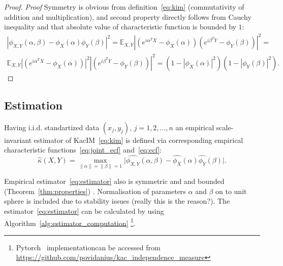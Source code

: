 \documentclass{article}
\begin{document}
\begin{proof}
\textit{Proof}
Symmetry is obvious from definition~\eqref{eq:kim} (commutativity of addition and multiplication), and second property directly follows from Cauchy inequality and that absolute value of characteristic function is bounded by $1$:
\begin{multline*}
|\phi_{X,Y}(\alpha, \beta)  -\phi_{X}(\alpha) \phi_{Y}(\beta)|^{2} =
\mathbb{E}_{X,Y} |( e^{i\alpha^{T}X} - \phi_{X}(\alpha) )(e^{i\beta^{T}Y}- \phi_{Y}(\beta) )|^{2} = \\
\mathbb{E}_{X,Y} |( e^{i\alpha^{T}X} - \phi_{X}(\alpha) )|^{2} |(e^{i\beta^{T}Y}- \phi_{Y}(\beta) )|^{2}  = (1 - |\phi_{X}(\alpha)|^{2}) (1 - |\phi_{Y}(\beta)|^{2}).
\end{multline*}
\end{proof}


\subsection{Estimation}

Having i.i.d. standartized data $(x_{j}, y_{j})$, $j = 1,2,...,n$ an empirical scale-invariant estimator of KacIM~\eqref{eq:kim} is defined via corresponding empirical characteristic functions~\eqref{eq:joint_ecf} and~\eqref{eq:ecf}:
\begin{equation}
\label{eq:estimator}
    \hat{\kappa}(X,Y) = \max_{\|\alpha\| = \|\beta\| = 1} \vert \widehat{\phi_{X,Y}}(\alpha,\beta)  - \widehat{\phi_{X}}(\alpha) \widehat{\phi_{Y}}(\beta) \vert.
\end{equation}

\noindent Empirical estimator~\eqref{eq:estimator} also is symmetric and and bounded (Theorem~\ref{thm:properties}) . Normalisation of parameters $\alpha$ and $\beta$ on to unit sphere is included due to stability issues (really this is the reason?). The  estimator~\eqref{eq:estimator} can be calculated by using Algorithm~\ref{alg:estimator_computation} \footnote{ Pytorch~\cite{NEURIPS2019_9015} implementationcan be accessed from \url{https://github.com/povidanius/kac_independence_measure}}. 
\end{document}
